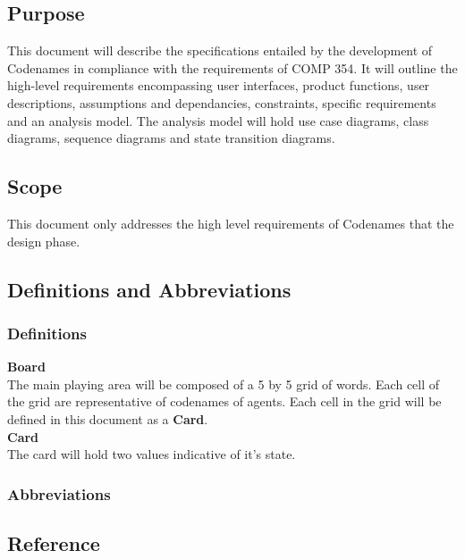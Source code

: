 \documentclass[12pt, a4paper]{article}
\begin{document}
	\subsection{Purpose}
	
	This document will describe the specifications entailed by the development of Codenames in compliance with the requirements of COMP 354. It will outline the high-level requirements encompassing user interfaces, product functions, user descriptions, assumptions and dependancies, constraints, specific requirements and an analysis model. The analysis model will hold use case diagrams, class diagrams, sequence diagrams and state transition diagrams.
	
	\subsection{Scope}
	
	This document only addresses the high level requirements of Codenames  that the design phase.  \\
	

	\subsection{Definitions and Abbreviations}
	
		\subsubsection{Definitions}
	
		\textbf{Board} \\
		The main playing area will be composed of a 5 by 5 grid of words. Each cell of the grid are representative of codenames of agents. Each cell in the grid will be defined in this document as a \textbf{Card}.\\
	
		\textbf{Card} \\
		The card will hold two values indicative of it's state.\\
	
		\subsubsection{Abbreviations}
	
	\subsection{Reference}
	
\end{document}
